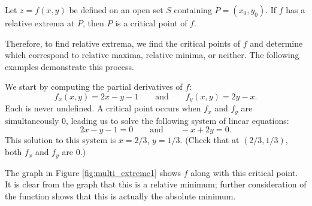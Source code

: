 {Let $z=f(x,y)$ be defined on an open set $S$ containing $P=(x_0,y_0)$. If $f$ has a relative extrema at $P$, then $P$ is a critical point of $f$.
}

Therefore, to find relative extrema, we find the critical points of $f$ and determine which correspond to relative maxima, relative minima, or neither. The following examples demonstrate this process.\\

{We start by computing the partial derivatives of $f$:
$$f_x(x,y) = 2x-y-1 \qquad \text{and}\qquad f_y(x,y) = 2y-x.$$
Each is never undefined. A critical point occurs when $f_x$ and $f_y$ are simultaneously 0, leading us to solve the following system of linear equations:
$$2x-y-1 = 0\qquad \text{and}\qquad -x+2y = 0.$$
This solution to this system is $x=2/3$, $y=1/3$. (Check that at $(2/3,1/3)$, both $f_x$ and $f_y$ are 0.)

The graph in Figure \ref{fig:multi_extreme1} shows $f$ along with this critical point. It is clear from the graph that this is a relative minimum; further consideration of the function shows that this is actually the absolute minimum.
}\\

